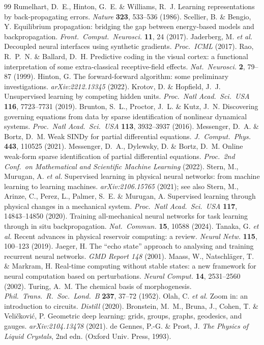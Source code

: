 \documentclass[11pt]{article}
\begin{document}
\begin{thebibliography}{99}
 Rumelhart, D.~E., Hinton, G.~E. \& Williams, R.~J. Learning
representations by back-propagating errors. \emph{Nature} \textbf{323}, 533--536
(1986).
 Scellier, B. \& Bengio, Y. Equilibrium propagation: bridging the gap
between energy-based models and backpropagation. \emph{Front.~Comput.~Neurosci.}
\textbf{11}, 24 (2017).
 Jaderberg, M. \emph{et al.} Decoupled neural interfaces using
synthetic gradients. \emph{Proc.~ICML} (2017).
 Rao, R.~P.~N. \& Ballard, D.~H. Predictive coding in the visual cortex:
a functional interpretation of some extra-classical receptive-field effects.
\emph{Nat.~Neurosci.} \textbf{2}, 79--87 (1999).
 Hinton, G. The forward-forward algorithm: some preliminary
investigations. \emph{arXiv:2212.13345} (2022).
 Krotov, D. \& Hopfield, J.~J. Unsupervised learning by competing hidden
units. \emph{Proc.~Natl Acad.~Sci.~USA} \textbf{116}, 7723--7731 (2019).
 Brunton, S.~L., Proctor, J.~L. \& Kutz, J.~N. Discovering governing
equations from data by sparse identification of nonlinear dynamical systems.
\emph{Proc.~Natl Acad.~Sci.~USA} \textbf{113}, 3932--3937 (2016).
 Messenger, D.~A. \& Bortz, D.~M. Weak SINDy for partial
differential equations. \emph{J.~Comput.~Phys.} \textbf{443}, 110525 (2021).
 Messenger, D.~A., Dylewsky, D. \& Bortz, D.~M. Online weak-form
sparse identification of partial differential equations. \emph{Proc.~2nd Conf.~on
Mathematical and Scientific Machine Learning} (2022).
 Stern, M., Murugan, A. \emph{et al.} Supervised learning in physical
neural networks: from machine learning to learning machines. \emph{arXiv:2106.15765}
(2021); see also Stern, M., Arinze, C., Perez, L., Palmer, S.~E. \& Murugan, A.
Supervised learning through physical changes in a mechanical system. \emph{Proc.~Natl
Acad.~Sci.~USA} \textbf{117}, 14843--14850 (2020).
 Training all-mechanical neural networks for task learning through in
situ backpropagation. \emph{Nat.~Commun.} \textbf{15}, 10588 (2024).
 Tanaka, G. \emph{et al.} Recent advances in physical reservoir
computing: a review. \emph{Neural Netw.} \textbf{115}, 100--123 (2019).
 Jaeger, H. The ``echo state'' approach to analysing and training
recurrent neural networks. \emph{GMD Report 148} (2001).
 Maass, W., Natschläger, T. \& Markram, H. Real-time computing without
stable states: a new framework for neural computation based on perturbations.
\emph{Neural Comput.} \textbf{14}, 2531--2560 (2002).
 Turing, A.~M. The chemical basis of morphogenesis.
\emph{Phil.~Trans.~R.~Soc.~Lond.~B} \textbf{237}, 37--72 (1952).
 Olah, C. \emph{et al.} Zoom in: an introduction to circuits.
\emph{Distill} (2020).
 Bronstein, M.~M., Bruna, J., Cohen, T. \& Veličković, P.
Geometric deep learning: grids, groups, graphs, geodesics, and gauges.
\emph{arXiv:2104.13478} (2021).
 de Gennes, P.-G. \& Prost, J. \emph{The Physics of Liquid Crystals},
2nd edn. (Oxford Univ. Press, 1993).
\end{thebibliography}
\end{document}
